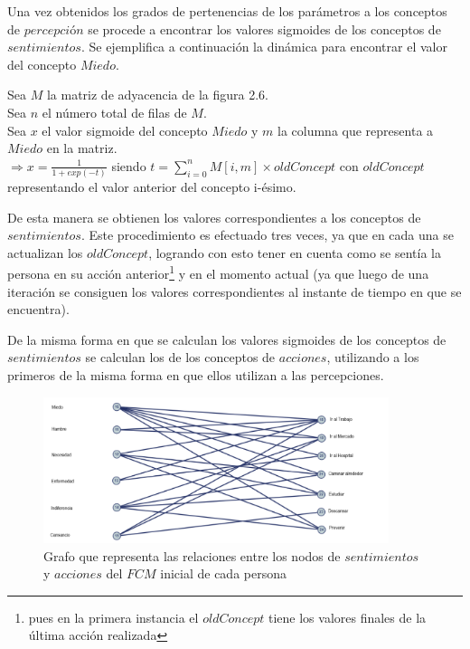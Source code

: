 Una vez obtenidos los grados de pertenencias de los parámetros a los conceptos de $percepci$ó$n$ se procede 
a encontrar los valores sigmoides de los conceptos de $sentimientos$. Se ejemplifica a continuación la dinámica
para encontrar el valor del concepto $Miedo$.
\begin{center}
    Sea $M$ la matriz de adyacencia de la figura 2.6.\\
    Sea $n$ el número total de filas de $M$.\\
    Sea $x$ el valor sigmoide del concepto $Miedo$ y $m$ la columna que representa a $Miedo$ en la matriz.\\
    $\Rightarrow x = \frac{1}{1+ exp(-t)}$ siendo $t = \displaystyle\sum_{i=0}^{n}M[i,m]\times oldConcept$ con $oldConcept$
    representando el valor anterior del concepto i-ésimo.
\end{center}

De esta manera se obtienen los valores correspondientes a los conceptos de $sentimientos$. Este procedimiento
es efectuado tres veces, ya que en cada una se actualizan los $oldConcept$, logrando con esto tener en 
cuenta como se sentía la persona en su acción anterior\footnote{pues en la primera instancia el $oldConcept$
tiene los valores finales de la última acción realizada} y en el momento actual (ya que luego de una iteración
se consiguen los valores correspondientes al instante de tiempo en que se encuentra).

De la misma forma en que se calculan los valores sigmoides de los conceptos de $sentimientos$ se 
calculan los de los conceptos de $acciones$, utilizando a los primeros de la misma forma en que ellos
utilizan a las percepciones.
\begin{figure}[htb]
    \centering
    \includegraphics[width=0.9\textwidth]{Graphics/Grafo_Sent-Acciones.png}
    \caption{Grafo que representa las relaciones entre los nodos de $sentimientos$ y $acciones$ del $FCM$ inicial de cada persona}
\end{figure}

